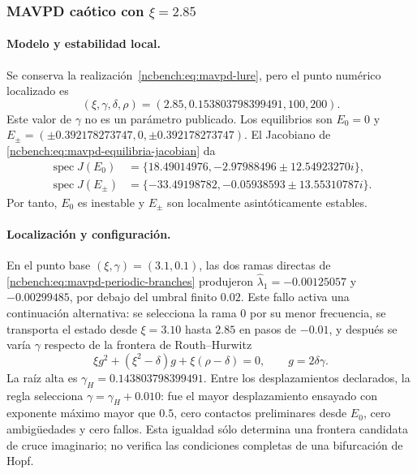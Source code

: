 \subsubsection{MAVPD caótico con \texorpdfstring{\(\xi=2.85\)}{xi=2.85}}

\paragraph{Modelo y estabilidad local.}
Se conserva la realización~\eqref{ncbench:eq:mavpd-lure}, pero el punto
numérico localizado es
\begin{equation}
 (\xi,\gamma,\delta,\rho)=
 (2.85,0.153803798399491,100,200).
 \label{ncbench:eq:mavpd-chaos-parameters}
\end{equation}
Este valor de \(\gamma\) no es un parámetro publicado. Los equilibrios son
\(E_0=0\) y
\(E_\pm=(\pm0.392178273747,0,\pm0.392178273747)\). El Jacobiano de
\eqref{ncbench:eq:mavpd-equilibria-jacobian} da
\begin{equation}
 \begin{aligned}
  \operatorname{spec}J(E_0)&=
  \{18.49014976,-2.97988496\pm12.54923270i\},\\
  \operatorname{spec}J(E_\pm)&=
  \{-33.49198782,-0.05938593\pm13.55310787i\}.
 \end{aligned}
 \label{ncbench:eq:mavpd-chaos-spectra}
\end{equation}
Por tanto, \(E_0\) es inestable y \(E_\pm\) son localmente asintóticamente
estables.

\paragraph{Localización y configuración.}
En el punto base \((\xi,\gamma)=(3.1,0.1)\), las dos ramas directas de
\eqref{ncbench:eq:mavpd-periodic-branches} produjeron
\(\widehat\lambda_1=-0.00125057\) y \(-0.00299485\), por debajo del umbral
finito \(0.02\). Este fallo activa una continuación alternativa: se selecciona
la rama 0 por su menor frecuencia, se transporta el estado desde
\(\xi=3.10\) hasta \(2.85\) en pasos de \(-0.01\), y después se varía
\(\gamma\) respecto de la frontera de Routh--Hurwitz
\begin{equation}
 \xi g^2+(\xi^2-\delta)g+\xi(\rho-\delta)=0,
 \qquad g=2\delta\gamma.
 \label{ncbench:eq:mavpd-hopf-boundary}
\end{equation}
La raíz alta es \(\gamma_H=0.143803798399491\). Entre los desplazamientos
declarados, la regla selecciona \(\gamma=\gamma_H+0.010\): fue el mayor
desplazamiento ensayado con exponente máximo mayor que \(0.5\), cero contactos
preliminares desde \(E_0\), cero ambigüedades y cero fallos. Esta igualdad sólo
determina una frontera candidata de cruce imaginario; no verifica las
condiciones completas de una bifurcación de Hopf.

